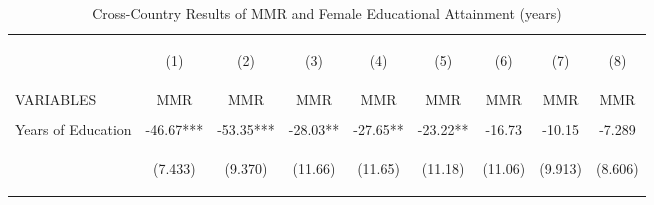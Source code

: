 \begin{landscape}\begin{subtables}\begin{table}[htpb!]\begin{center}\caption{Cross-Country Results of MMR and Female Educational Attainment (years)}\label{MMRtab:MMRyrs}\begin{tabular}{lcccccccc}\toprule&\begin{footnotesize}(1)\end{footnotesize}&\begin{footnotesize}(2)\end{footnotesize}&\begin{footnotesize}(3)\end{footnotesize}&\begin{footnotesize}(4)\end{footnotesize}&\begin{footnotesize}(5)\end{footnotesize}&\begin{footnotesize}(6)\end{footnotesize}&\begin{footnotesize}(7)\end{footnotesize}&\begin{footnotesize}(8) \end{footnotesize}\\
VARIABLES&MMR&MMR&MMR&MMR&MMR&MMR&MMR&MMR\\ \midrule
&&&&&&&&\\
Years of Education&-46.67***&-53.35***&-28.03**&-27.65**&-23.22**&-16.73&-10.15&-7.289\\
&\begin{footnotesize}(7.433)\end{footnotesize}&\begin{footnotesize}(9.370)\end{footnotesize}&\begin{footnotesize}(11.66)\end{footnotesize}&\begin{footnotesize}(11.65)\end{footnotesize}&\begin{footnotesize}(11.18)\end{footnotesize}&\begin{footnotesize}(11.06)\end{footnotesize}&\begin{footnotesize}(9.913)\end{footnotesize}&\begin{footnotesize}(8.606)\end{footnotesize}\\

\end{tabular}
\end{center}
\end{table}
\end{subtables}
\end{landscape}
